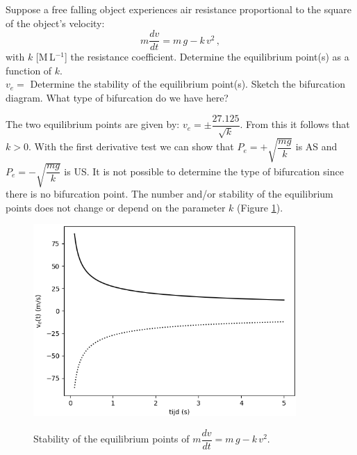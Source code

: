 \begin{Exercise} Suppose a free falling object experiences air resistance proportional to the square of the object's velocity:
	$$
	m\dfrac{dv}{dt} = m\,g - k\,v^2\,,
	$$
	with $k$ [M$\,$L$^{-1}$] the resistance coefficient.
		\Question Determine the equilibrium point(s) as a function of $k$.\\[0.5cm]
		$v_e = $\vspace*{1cm}
		\Question Determine the stability of the equilibrium point(s). %
		\Question Sketch the bifurcation diagram. What type of bifurcation do we have here?\\[2cm]
    \EndCurrentQuestion
\end{Exercise}

\begin{Answer}
    \Question The two equilibrium points are given by: $v_e = \pm \dfrac{27.125}{\sqrt{k}}$. From this it follows that $k > 0$.
    \Question With the first derivative test we can show that $P_e = +\sqrt{\dfrac{mg}{k}}$ is AS and $P_e = -\sqrt{\dfrac{mg}{k}}$ is US. 
    \Question It is not possible to determine the type of bifurcation since there is no bifurcation point. The number and/or stability of the equilibrium points does not change or depend on the parameter $k$ (Figure \ref{fig:oefening2_4_3_2c}).%
    
\begin{figure}[H]
	\centering				\includegraphics[width=10cm]{oefening2_4_3_2c.png}\\
	\caption{Stability of the equilibrium points of $m \dfrac{dv}{dt} = m\,g-k\,v^2$. \label{fig:oefening2_4_3_2c}}
\end{figure}

    \EndCurrentQuestion
\end{Answer}
